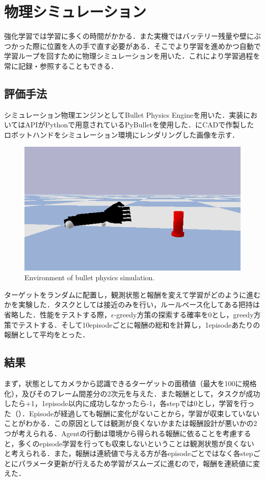 \section{物理シミュレーション}
強化学習では学習に多くの時間がかかる．また実機ではバッテリー残量や壁にぶつかった際に位置を人の手で直す必要がある．そこでより学習を進めかつ自動で学習ループを回すために物理シミュレーションを用いた．これにより学習過程を常に記録・参照することもできる．


\subsection{評価手法}
シミュレーション物理エンジンとしてBullet Physics Engineを用いた．実装においてはAPIがPythonで用意されているPyBullet\cite{pybullet}を使用した．にCADで作製したロボットハンドをシミュレーション環境にレンダリングした画像を示す．

\begin{figure}[H]
    \centering
    \includegraphics[width=0.7\linewidth]{figure/chapter3/bullet_demo}
    \caption{Environment of bullet physics simulation.}
    \label{fig:1号機simu}
\end{figure}

ターゲットをランダムに配置し，観測状態と報酬を変えて学習がどのように進むかを実験した．タスクとしては接近のみを行い，ルールベース化してある把持は省略した．性能をテストする際，$\epsilon$-greedy方策の探索する確率を0とし，greedy方策でテストする．そして10episodeごとに報酬の総和を計算し，1episodeあたりの報酬として平均をとった．


\subsection{結果}
まず，状態としてカメラから認識できるターゲットの面積値（最大を100に規格化），及びそのフレーム間差分の2次元を与えた．また報酬として，タスクが成功したら+1，1episode以内に成功しなかったら-1，各stepでは0とし，学習を行った（）．Episodeが経過しても報酬に変化がないことから，学習が収束していないことがわかる．この原因としては観測が良くないかまたは報酬設計が悪いかの2つが考えられる．Agentの行動は環境から得られる報酬に依ることを考慮すると，多くのepisode学習を行っても収束しないということは観測状態が良くないと考えられる．また，報酬は連続値で与える方が各episodeごとではなく各stepごとにパラメータ更新が行えるため学習がスムーズに進むので，報酬を連続値に変えた．

